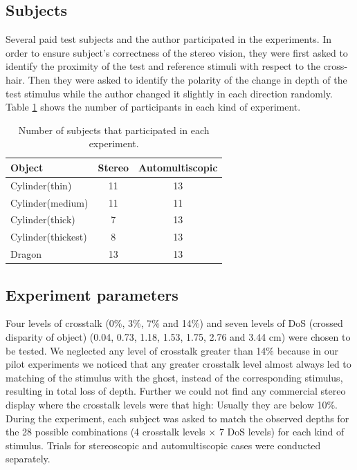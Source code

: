 \subsection{Subjects}
Several paid test subjects and the author participated in the experiments. In order to ensure subject's correctness of the stereo vision, they were first asked to identify the proximity of the test and reference stimuli with respect to the cross-hair. Then they were asked to identify the polarity of the change in depth of the test stimulus while the author changed it slightly in each direction randomly. Table \ref{tab:agg_subj} shows the number of participants in each kind of experiment.
\begin{table}[ht!]
  \begin{center}
    \caption{Number of subjects that participated in each experiment.}
    \label{tab:agg_subj}
    \begin{tabular}{lcc}
      \toprule
      Object & Stereo  & Automultiscopic\\
      \midrule
      Cylinder(thin) & 11 & 13  \\
      Cylinder(medium) & 11 & 11\\
      Cylinder(thick) & 7 & 13\\
      Cylinder(thickest) & 8 & 13 \\
      Dragon & 13 & 13\\
      \bottomrule
    \end{tabular}
  \end{center}
\end{table}

\subsection{Experiment parameters}
Four levels of crosstalk (0\%, 3\%, 7\% and 14\%) and seven levels of DoS (crossed disparity of object) (0.04, 0.73, 1.18, 1.53, 1.75, 2.76 and 3.44 cm) were chosen to be tested. We neglected any level of crosstalk greater than 14\% because in our pilot experiments we noticed that any greater crosstalk level almost always led to matching of the stimulus with the ghost, instead of the corresponding stimulus, resulting in total loss of depth. Further we could not find any commercial stereo display where the crosstalk levels were that high: Usually they are below 10\%. During the experiment, each subject was asked to match the observed depths for the 28 possible combinations (4 crosstalk levels $\times$ 7 DoS levels) for each kind of stimulus. Trials for stereoscopic and automultiscopic cases were conducted separately.
\\
